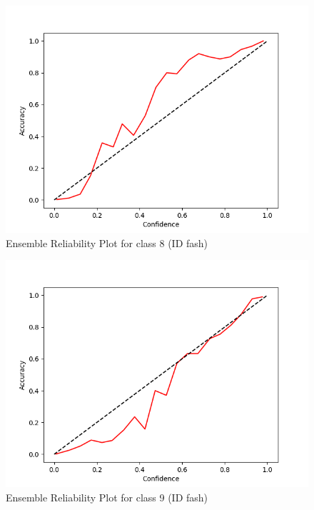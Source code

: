 \documentclass[11pt]{article}
\begin{document}
\begin{figure}[htbp]
\centering
\includegraphics[width=.9\linewidth]{./ens_fash_rel_8.png}
\caption{\label{fig:org01f3666}
Ensemble Reliability Plot for class 8 (ID fash)}
\end{figure}

\begin{figure}[htbp]
\centering
\includegraphics[width=.9\linewidth]{./ens_fash_rel_9.png}
\caption{\label{fig:orgdc938ca}
Ensemble Reliability Plot for class 9 (ID fash)}
\end{figure}
\end{document}
